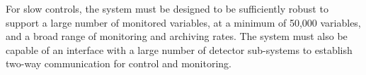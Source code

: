 For slow controls, the system must be designed to be sufficiently robust to support a large number of monitored variables, at a minimum of 50,000 variables, and a broad range of monitoring and archiving rates. The system must also be capable of an interface with a large number of detector sub-systems to establish two-way communication for control and monitoring. 




